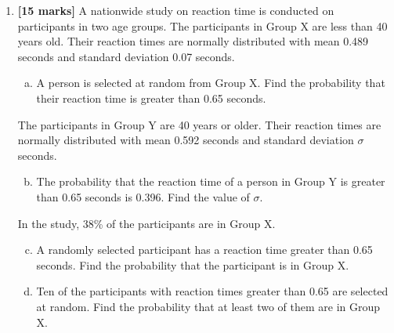 \documentclass[12pt, twoside]{article}
\begin{document}
\begin{enumerate}
\begin{enumerate}[(a)]
    \setcounter{enumii}{1}
    \item \begin{enumerate}[(i)]
        \item Find the value of $y$.
        \item Show that $\overrightarrow{\mathrm{AC}} = \begin{pmatrix} 8 \\ -10 \\ -1 \end{pmatrix}$.
    \end{enumerate}
    \item Find the angle between $\overrightarrow{\mathrm{AB}}$ and $\overrightarrow{\mathrm{AC}}$.
    \item Find the area of triangle ABC.
\end{enumerate}

\vspace{1cm}

\item \textbf{[15 marks]} A nationwide study on reaction time is conducted on participants in two age groups. The participants in Group X are less than 40 years old. Their reaction times are normally distributed with mean 0.489 seconds and standard deviation 0.07 seconds.

\begin{enumerate}[(a)]
    \item A person is selected at random from Group X. Find the probability that their reaction time is greater than 0.65 seconds.
\end{enumerate}

The participants in Group Y are 40 years or older. Their reaction times are normally distributed with mean 0.592 seconds and standard deviation $\sigma$ seconds.

\begin{enumerate}[(a)]
    \setcounter{enumii}{1}
    \item The probability that the reaction time of a person in Group Y is greater than 0.65 seconds is 0.396. Find the value of $\sigma$.
\end{enumerate}

In the study, 38\% of the participants are in Group X.

\begin{enumerate}[(a)]
    \setcounter{enumii}{2}
    \item A randomly selected participant has a reaction time greater than 0.65 seconds. Find the probability that the participant is in Group X.
    \item Ten of the participants with reaction times greater than 0.65 are selected at random. Find the probability that at least two of them are in Group X.
\end{enumerate}


\end{enumerate}
\end{document}
